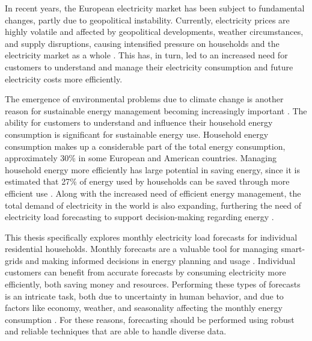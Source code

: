 
In recent years, the European electricity market has been subject to fundamental changes, partly due to geopolitical instability. Currently, electricity prices are highly volatile and affected by geopolitical developments, weather circumstances, and supply disruptions, causing intensified pressure on households and the electricity market as a whole \cite{cevik_shocked_2026}. This has, in turn, led to an increased need for customers to understand and manage their electricity consumption and future electricity costs more efficiently.

The emergence of environmental problems due to climate change is another reason for sustainable energy management becoming increasingly important \cite{chu_opportunities_2012,sim_explainable_2022}. The ability for customers to understand and influence their household energy consumption is significant for sustainable energy use. Household energy consumption makes up a considerable part of the total energy consumption, approximately 30\% in some European and American countries. Managing household energy more efficiently has large potential in saving energy, since it is estimated that 27\% of energy used by households can be saved through more efficient use \cite{zhou_understanding_2016}. Along with the increased need of efficient energy management, the total demand of electricity in the world is also expanding, furthering the need of electricity load forecasting to support decision-making regarding energy \cite{ahmad_review_2014,maarif_energy_2023}.

This thesis specifically explores monthly electricity load forecasts for individual residential households. Monthly forecasts are a valuable tool for managing smart-grids and making informed decisions in energy planning and usage \cite{tang_gm11_2022,kong_short-term_2019}. Individual customers can benefit from accurate forecasts by consuming electricity more efficiently, both saving money and resources. Performing these types of forecasts is an intricate task, both due to uncertainty in human behavior, and due to factors like economy, weather, and seasonality affecting the monthly energy consumption \cite{kong_short-term_2019,sun_monthly_2019}. For these reasons, forecasting should be performed using robust and reliable techniques that are able to handle diverse data.

